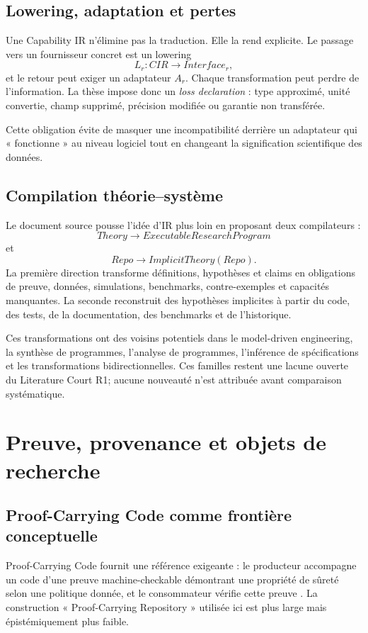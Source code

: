 \section{Lowering, adaptation et pertes}

Une Capability IR n'élimine pas la traduction. Elle la rend explicite. Le passage vers un fournisseur concret est un lowering
\[
L_r:CIR\rightarrow Interface_r,
\]
et le retour peut exiger un adaptateur $A_r$. Chaque transformation peut perdre de l'information. La thèse impose donc un \emph{loss declaration} : type approximé, unité convertie, champ supprimé, précision modifiée ou garantie non transférée.

Cette obligation évite de masquer une incompatibilité derrière un adaptateur qui « fonctionne » au niveau logiciel tout en changeant la signification scientifique des données.

\section{Compilation théorie--système}

Le document source pousse l'idée d'IR plus loin en proposant deux compilateurs :
\[
Theory\rightarrow ExecutableResearchProgram
\]
et
\[
Repo\rightarrow ImplicitTheory(Repo).
\]
La première direction transforme définitions, hypothèses et claims en obligations de preuve, données, simulations, benchmarks, contre-exemples et capacités manquantes. La seconde reconstruit des hypothèses implicites à partir du code, des tests, de la documentation, des benchmarks et de l'historique.

Ces transformations ont des voisins potentiels dans le model-driven engineering, la synthèse de programmes, l'analyse de programmes, l'inférence de spécifications et les transformations bidirectionnelles. Ces familles restent une lacune ouverte du Literature Court R1; aucune nouveauté n'est attribuée avant comparaison systématique.

\chapter{Preuve, provenance et objets de recherche}

\section{Proof-Carrying Code comme frontière conceptuelle}

Proof-Carrying Code fournit une référence exigeante : le producteur accompagne un code d'une preuve machine-checkable démontrant une propriété de sûreté selon une politique donnée, et le consommateur vérifie cette preuve \cite{necula1997pcc}. La construction « Proof-Carrying Repository » utilisée ici est plus large mais épistémiquement plus faible.

